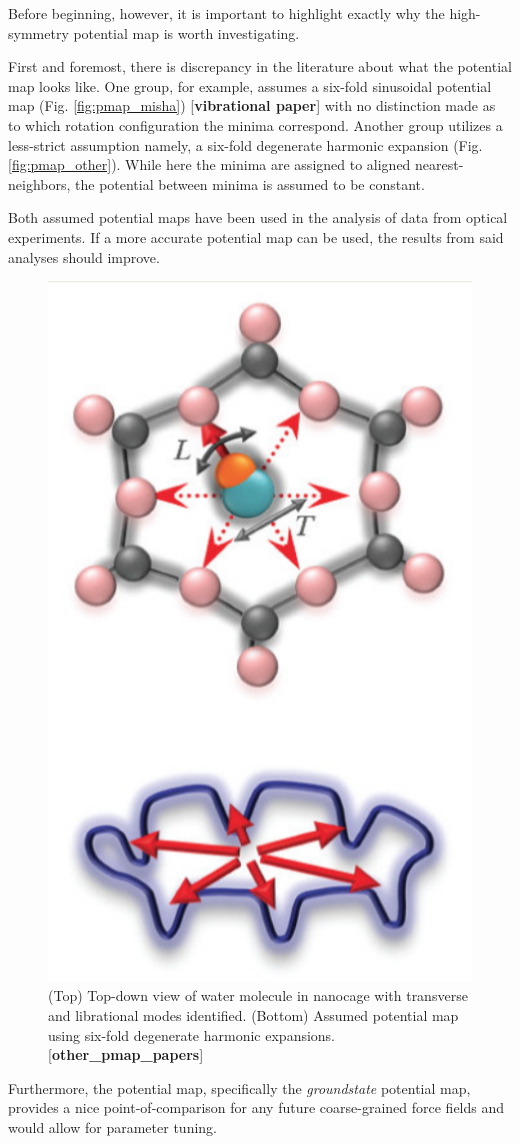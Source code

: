     Before beginning, however, it is important to highlight exactly why the high-symmetry potential map is worth investigating.
    
    First and foremost, there is discrepancy in the literature about what the potential map looks like. One group, for example, assumes a six-fold sinusoidal potential map (Fig. \ref{fig:pmap_misha}) [\textbf{vibrational paper}] with no distinction made as to which rotation configuration the minima correspond. Another group utilizes a less-strict assumption \textemdash namely, a six-fold degenerate harmonic expansion (Fig. \ref{fig:pmap_other}). While here the minima are assigned to aligned nearest-neighbors, the potential between minima is assumed to be constant. 
    
    Both assumed potential maps have been used in the analysis of data from optical experiments. If a more accurate potential map can be used, the results from said analyses should improve.

    \begin{figure}
        \centering
        \includegraphics[width=0.5\linewidth]{Figures/System/pmap_other.png}
        \caption{(Top) Top-down view of water molecule in nanocage with transverse and librational modes identified. (Bottom) Assumed potential map using six-fold degenerate harmonic expansions. [\textbf{other_pmap_papers}]}
        \label{fig:pamp_other}
    \end{figure}
    
    Furthermore, the potential map, specifically the \textit{groundstate} potential map, provides a nice point-of-comparison for any future coarse-grained force fields and would allow for parameter tuning.

